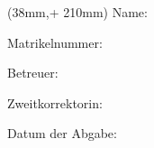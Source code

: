 \begin{textblock*}{128mm}(38mm,\seitenanfang + 210mm)%
   \large \sffamily
  Name: \hspace{32mm}  \hsmaautor  
  
  Matrikelnummer: \hspace{10mm} \hsmaautornmatr
  
  Betreuer: \hspace{26mm} \hsmabetreuer
  
  Zweitkorrektorin: \hspace{10,5mm} \hsmazweitkorrektor
  
  Datum der Abgabe: \hspace{4,5mm} \hsmadatum
\end{textblock*}












\null\newpage
\thispagestyle{empty}
  
\newcommand{\hsmabibde}{\begin{small}\textbf{\hsmaautorbib}: \\ \hsmatitelde \ / \hsmaautor. \ -- \\ \hsmatypde, \hsmaort : \hsmakoerperschaftde, \hsmajahr. \pageref{lastpage} Seiten.\end{small}}

